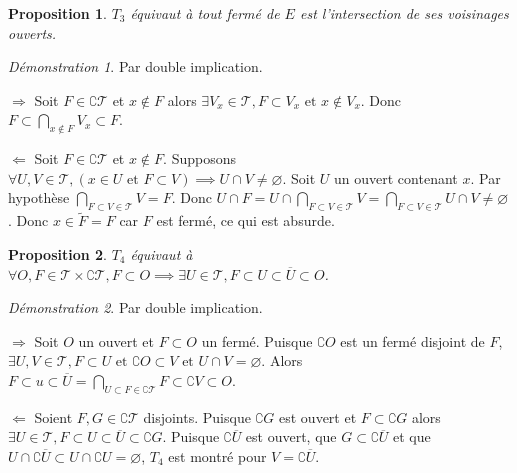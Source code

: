 \documentclass[a4paper, 11pt, french]{book}
\newenvironment{itemise}{\itemize}{\enditemize}
\theoremstyle{plain} %
\newtheorem{proposition}{Proposition}
\theoremstyle{definition} %
\theoremstyle{remark} %
\newtheorem*{demonstration}{Démonstration}
\newcommand{\1}{\mathds{1}}
\newcommand\vide{\varnothing}
\newcommand\et{\text{ et }}
\begin{document}
\begin{proposition}
	$T_3$ équivaut à tout fermé de $E$ est l'intersection de ses voisinages ouverts.
\end{proposition}

\begin{demonstration}
	Par double implication.
	\begin{itemise}
		\item[$\Rightarrow$] Soit $F\in\complement\mathscr{T}$ et $x\notin F$ alors $\exists V_x\in\mathscr{T}, F\subset V_x\et x\notin V_x$.
		Donc $F\subset\bigcap_{x\notin F}V_x\subset F$.
		\item[$\Leftarrow$] Soit $F\in\complement\mathscr{T}$ et $x\notin F$.
		Supposons $\forall U, V\in\mathscr{T}, (x\in U\et F\subset V)\implies U\cap V\neq\vide$.
		Soit $U$ un ouvert contenant $x$.
		Par hypothèse $\bigcap_{F\subset V\in\mathscr{T}}V=F$.
		Donc $U\cap F=U\cap\bigcap_{F\subset V\in\mathscr{T}}V=\bigcap_{F\subset V\in\mathscr{T}}U\cap V\neq\vide$.
		Donc $x\in\widetilde{F}=F$ car $F$ est fermé, ce qui est absurde.
	\end{itemise}
\end{demonstration}

\begin{proposition}
	$T_4$ équivaut à $\forall O, F\in\mathscr{T}\times\complement\mathscr{T}, F\subset O\implies\exists U\in\mathscr{T}, F\subset U\subset\overline{U}\subset O$.
\end{proposition}

\begin{demonstration}
	Par double implication.
	\begin{itemise}
		\item[$\Rightarrow$] Soit $O$ un ouvert et $F\subset O$ un fermé.
		Puisque $\complement O$ est un fermé disjoint de $F$, $\exists U, V\in\mathscr{T}, F\subset U\et\complement O\subset V\et U\cap V=\vide$.
		Alors $F\subset u\subset\overline{U}=\bigcap_{U\subset F\in\complement\mathscr{T}}F\subset\complement V\subset O$.
		\item[$\Leftarrow$] Soient $F, G\in\complement\mathscr{T}$ disjoints.
		Puisque $\complement G$ est ouvert et $F\subset\complement G$ alors $\exists U\in\mathscr{T}, F\subset U\subset\overline{U}\subset\complement G$.
		Puisque $\complement\overline{U}$ est ouvert, que $G\subset\complement\overline{U}$ et que $U\cap\complement\overline{U}\subset U\cap\complement U=\vide$, $T_4$ est montré pour $V=\complement\overline{U}$.
	\end{itemise}
\end{demonstration}
\end{document}
